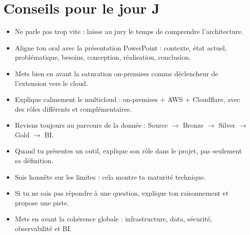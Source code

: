\documentclass[11pt,a4paper]{article}
\begin{document}
\section{Conseils pour le jour J}

\begin{itemize}
  \item Ne parle pas trop vite : laisse au jury le temps de comprendre l'architecture.
  \item Aligne ton oral avec la présentation PowerPoint : contexte, état actuel, problématique, besoins, conception, réalisation, conclusion.
  \item Mets bien en avant la saturation on-premises comme déclencheur de l'extension vers le cloud.
  \item Explique calmement le multicloud : on-premises + AWS + Cloudflare, avec des rôles différents et complémentaires.
  \item Reviens toujours au parcours de la donnée : Source $\rightarrow$ Bronze $\rightarrow$ Silver $\rightarrow$ Gold $\rightarrow$ BI.
  \item Quand tu présentes un outil, explique son rôle dans le projet, pas seulement sa définition.
  \item Sois honnête sur les limites : cela montre ta maturité technique.
  \item Si tu ne sais pas répondre à une question, explique ton raisonnement et propose une piste.
  \item Mets en avant la cohérence globale : infrastructure, data, sécurité, observabilité et BI.
\end{itemize}
\end{document}
